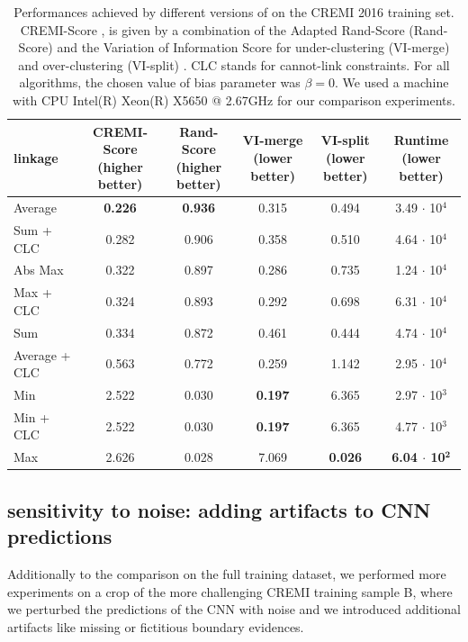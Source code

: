 \begin{table}[t]
\centering
    \footnotesize
        \begin{tabular}{l|c|c|c|c|c}
          \algname{} linkage & \makecell{CREMI-Score\\(higher better)}  & \makecell{Rand-Score\\(higher better)} & \makecell{VI-merge\\(lower better)} & \makecell{VI-split\\(lower better)} & \makecell{Runtime\\(lower better)} \\ \midrule
Average & \textbf{0.226} & \textbf{0.936} & 0.315 & 0.494 & 3.49 $\cdot$ 10$^4$ \\
Sum + CLC \cite{levinkov2017comparative} & 0.282 & 0.906 & 0.358 & 0.510 & 4.64 $\cdot$ 10$^4$ \\
Abs Max \cite{wolf2018mutex} & 0.322 & 0.897 & 0.286 & 0.735 & 1.24 $\cdot$ 10$^4$ \\
Max + CLC & 0.324 & 0.893 & 0.292 & 0.698 & 6.31 $\cdot$ 10$^4$ \\
Sum \cite{keuper2015efficient} & 0.334 & 0.872 & 0.461 & 0.444 & 4.74 $\cdot$ 10$^4$ \\
Average + CLC & 0.563 & 0.772 & 0.259  & 1.142 & 2.95 $\cdot$ 10$^4$ \\
Min & 2.522 & 0.030 & \textbf{0.197} & 6.365 & 2.97 $\cdot$ 10$^3$ \\
Min + CLC & 2.522 & 0.030 & \textbf{0.197}  & 6.365 & 4.77 $\cdot$ 10$^3$ \\
Max & 2.626 & 0.028 & 7.069 & \textbf{0.026} & \textbf{6.04 $\cdot$ 10$^\mathbf{2}$} \\
        \end{tabular}
        \vspace*{1.1em}
    \caption{Performances achieved by different versions of \algname{} on the CREMI 2016 training set. 
    CREMI-Score \cite{cremiChallenge}, is given by a combination of the Adapted Rand-Score (Rand-Score) and the Variation of Information Score for under-clustering (VI-merge) and over-clustering (VI-split) \cite{arganda2015crowdsourcing}.
    CLC stands for cannot-link constraints. For all algorithms, the chosen value of bias parameter was $\beta = 0$. We used a machine with CPU Intel(R) Xeon(R) X5650  @ 2.67GHz for our comparison experiments.}
    \label{tab:extended_results_cremi}
\end{table}


\subsection{\algname{} sensitivity to noise: adding artifacts to CNN predictions} \label{sec:appendix_noise_gen}
Additionally to the comparison on the full training dataset, we performed more experiments on a crop of the more challenging CREMI training sample B, where we perturbed the predictions of the CNN with noise and we introduced additional artifacts like missing or fictitious boundary evidences.

